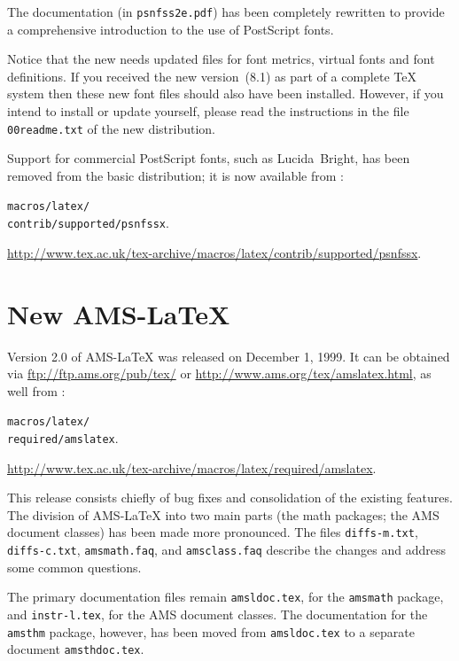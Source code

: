 \documentclass{ltnews}
\providecommand\pkg[1]{\texttt{#1}}
\providecommand\file[1]{\texttt{#1}}
\begin{document}
The documentation (in \file{psnfss2e.pdf}) has been completely
rewritten to provide a comprehensive introduction to the use
of PostScript fonts.

Notice that the new \PSNFSS{} needs updated files for font metrics,
virtual fonts and font definitions.  If you received the new
version~(8.1) as part of a complete \TeX{} system then these new font
files should also have been installed.  However, if you intend to
install or update \PSNFSS{} yourself, please read the instructions in
the file \file{00readme.txt} of the new \PSNFSS{} distribution.

Support for commercial PostScript fonts, such as
Lucida~Bright, has been removed from the basic distribution;
it is now available from \ctan{}:
\begin{latexonly}
  \file{\ctanhttp macros/latex/\\
    contrib/supported/psnfssx}.
\end{latexonly}
\begin{htmlonly}
  \url{http://www.tex.ac.uk/tex-archive/macros/latex/contrib/supported/psnfssx}.
\end{htmlonly}

\section{New AMS-\LaTeX{}}

Version 2.0 of AMS-\LaTeX{} was released on December 1, 1999. It can
be obtained via \url{ftp://ftp.ams.org/pub/tex/} or
\url{http://www.ams.org/tex/amslatex.html}, as well from \ctan{}:
\begin{latexonly}
  \file{\ctanhttp macros/latex/\\
    required/amslatex}.
\end{latexonly}
\begin{htmlonly}
  \url{http://www.tex.ac.uk/tex-archive/macros/latex/required/amslatex}.
\end{htmlonly}

This release consists chiefly of bug fixes and consolidation of the
existing features. The division of AMS-\LaTeX{} into two main parts
(the math packages;\latex{\\}
the AMS document classes) has been made more pronounced.
The files \file{diffs-m.txt}, \file{diffs-c.txt},
\file{amsmath.faq}, and \file{amsclass.faq} describe the\latex{\\}
changes and address some common questions.

The primary documentation files remain \file{amsldoc.tex}, for the
\pkg{amsmath} package, and \file{instr-l.tex}, for the AMS
document classes.\latex{\\}
The documentation for the \pkg{amsthm} package,\latex{\\}
however, has been moved from \file{amsldoc.tex}\latex{\\}
to a separate document \file{amsthdoc.tex}.
\end{document}
